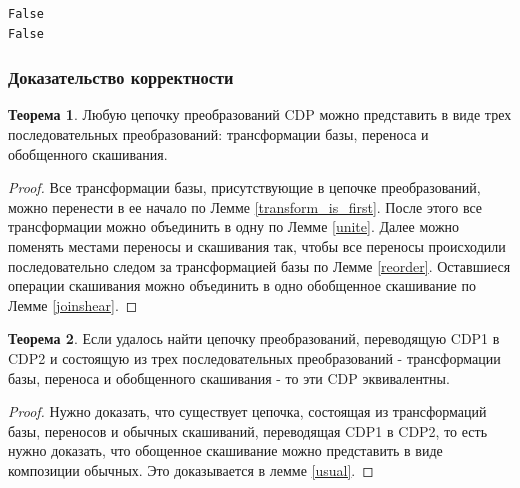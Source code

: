 \documentclass[fontsize=14pt]{scrartcl}
\theoremstyle{definition}
\newtheorem{theorem}{Теорема}[section]
\begin{document}
\begin{lstlisting}[style=output]
False
False
\end{lstlisting}


\subsubsection{Доказательство корректности}

\begin{theorem}
	Любую цепочку преобразований CDP можно представить в виде трех последовательных преобразований: трансформации базы, переноса и обобщенного скашивания.
\end{theorem}
\begin{proof}
	Все трансформации базы, присутствующие в цепочке преобразований, можно перенести в ее начало по Лемме \ref{transform_is_first}. После этого все трансформации можно объединить в одну по Лемме \ref{unite}. Далее можно поменять местами переносы и скашивания так, чтобы все переносы происходили последовательно следом за трансформацией базы по Лемме \ref{reorder}. Оставшиеся операции скашивания можно объединить в одно обобщенное скашивание по Лемме \ref{joinshear}.
\end{proof}

\begin{theorem}
	Если удалось найти цепочку преобразований, переводящую CDP1 в CDP2 и состоящую из трех последовательных преобразований - трансформации базы, переноса и обобщенного скашивания - то эти CDP эквивалентны.
\end{theorem}
\begin{proof}
	Нужно доказать, что существует цепочка, состоящая из трансформаций базы, переносов и обычных скашиваний, переводящая CDP1 в CDP2, то есть нужно доказать, что обощенное скашивание можно представить в виде композиции обычных. Это доказывается в лемме \ref{usual}.
\end{proof}
\end{document}
